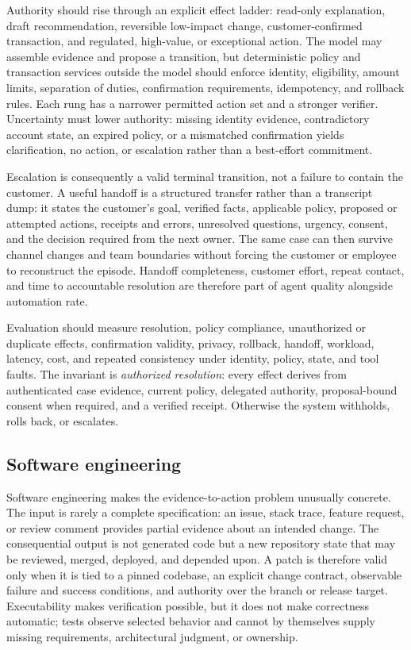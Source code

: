 Authority should rise through an explicit effect ladder: read-only explanation, draft recommendation, reversible low-impact change, customer-confirmed transaction, and regulated, high-value, or exceptional action. The model may assemble evidence and propose a transition, but deterministic policy and transaction services outside the model should enforce identity, eligibility, amount limits, separation of duties, confirmation requirements, idempotency, and rollback rules. Each rung has a narrower permitted action set and a stronger verifier. Uncertainty must lower authority: missing identity evidence, contradictory account state, an expired policy, or a mismatched confirmation yields clarification, no action, or escalation rather than a best-effort commitment.

Escalation is consequently a valid terminal transition, not a failure to contain the customer. A useful handoff is a structured transfer rather than a transcript dump: it states the customer's goal, verified facts, applicable policy, proposed or attempted actions, receipts and errors, unresolved questions, urgency, consent, and the decision required from the next owner. The same case can then survive channel changes and team boundaries without forcing the customer or employee to reconstruct the episode. Handoff completeness, customer effort, repeat contact, and time to accountable resolution are therefore part of agent quality alongside automation rate.

Evaluation should measure resolution, policy compliance, unauthorized or duplicate effects, confirmation validity, privacy, rollback, handoff, workload, latency, cost, and repeated consistency under identity, policy, state, and tool faults. The invariant is \emph{authorized resolution}: every effect derives from authenticated case evidence, current policy, delegated authority, proposal-bound consent when required, and a verified receipt. Otherwise the system withholds, rolls back, or escalates.

\subsection{Software engineering}

Software engineering makes the evidence-to-action problem unusually concrete. The input is rarely a complete specification: an issue, stack trace, feature request, or review comment provides partial evidence about an intended change. The consequential output is not generated code but a new repository state that may be reviewed, merged, deployed, and depended upon. A patch is therefore valid only when it is tied to a pinned codebase, an explicit change contract, observable failure and success conditions, and authority over the branch or release target. Executability makes verification possible, but it does not make correctness automatic; tests observe selected behavior and cannot by themselves supply missing requirements, architectural judgment, or ownership.

